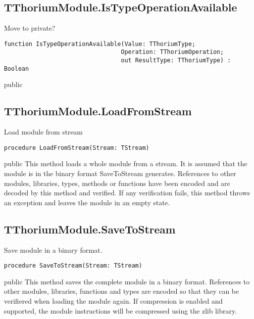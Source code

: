 \subsection{TThoriumModule.IsTypeOperationAvailable}
\label{thoriumcorepkg:thorium:tthoriummodule:istypeoperationavailable}
\begin{FPCList}
\Synopsis
Move to private?\Declaration 

\begin{verbatim}
function IsTypeOperationAvailable(Value: TThoriumType;
                                 Operation: TThoriumOperation;
                                 out ResultType: TThoriumType) : Boolean
\end{verbatim}
\Visibility
public
\end{FPCList}
\subsection{TThoriumModule.LoadFromStream}
\label{thoriumcorepkg:thorium:tthoriummodule:loadfromstream}
\begin{FPCList}
\Synopsis
Load module from stream\Declaration 

\begin{verbatim}
procedure LoadFromStream(Stream: TStream)
\end{verbatim}
\Visibility
public
\Description
This method loads a whole module from a stream. It is assumed that the module is in the binary format SaveToStream generates. References to other modules, libraries, types, methods or functions have been encoded and are decoded by this method and verified. If any verification fails, this method throws an exception and leaves the module in an empty state.\end{FPCList}
\subsection{TThoriumModule.SaveToStream}
\label{thoriumcorepkg:thorium:tthoriummodule:savetostream}
\begin{FPCList}
\Synopsis
Save module in a binary format.\Declaration 

\begin{verbatim}
procedure SaveToStream(Stream: TStream)
\end{verbatim}
\Visibility
public
\Description
This method saves the complete module in a binary format. References to other modules, libraries, functions and types are encoded so that they can be verifiered when loading the module again. If compression is enabled and supported, the module instructions will be compressed using the zlib library.\end{FPCList}
